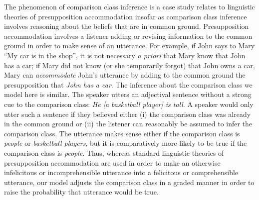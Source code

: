 \documentclass[doc]{apa6}
\begin{document}
The phenomenon of comparison class inference is a case study relates to linguistic theories of presupposition accommodation insofar as comparison class inference involves reasoning about the beliefs that are in common ground.
Presupposition accommodation involves a listener adding or revising information to the common ground in order to make sense of an utterance. For example, if John says to Mary ``My car is in the shop'', it is not necessary \emph{a priori} that Mary know that John has a car; if Mary did not know (or she temporarily forgot) that John owns a car, Mary can \emph{accommodate} John's utterance by adding to the common ground the presupposition that \emph{John has a car}. 
The inference about the comparison class we model here is similar. 
The speaker utters an adjectival sentence without a strong cue to the comparison class: \emph{He [a basketball player] is tall}. 
A speaker would only utter such a sentence if they believed either (i) the comparison class was already in the common ground or (ii) the listener can reasonably be assumed to infer the comparison class.
The utterance makes sense either if the comparison class is \emph{people} or \emph{basketball players}, but it is comparatively more likely to be true if the comparison class is \emph{people}. 
Thus, whereas standard linguistic theories of presupposition accommodation are used in order to make an otherwise infelicitous or incomprehensible utterance into a felicitous or comprehensible utterance, our model adjusts the comparison class in a graded manner in order to raise the probability that utterance would be true.
 
\end{document}
